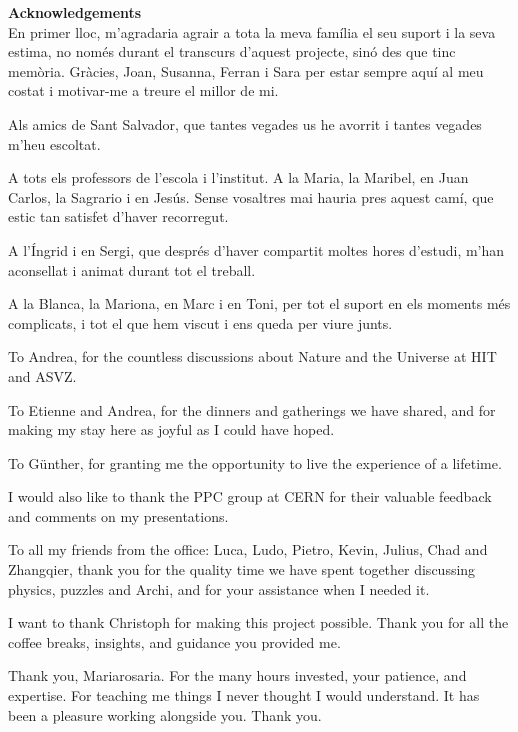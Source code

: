 \setlength{\parskip}{1em}
\thispagestyle{empty}
\noindent
{\huge \textbf{Acknowledgements}}
\\[1\baselineskip]
\noindent
En primer lloc, m'agradaria agrair a tota la meva família el seu suport i la seva estima, no només durant el transcurs d'aquest projecte, sinó des que tinc memòria. Gràcies, Joan, Susanna, Ferran i Sara per estar sempre aquí al meu costat i motivar-me a treure el millor de mi.

\noindent
Als amics de Sant Salvador, que tantes vegades us he avorrit i tantes vegades m'heu escoltat.

\noindent
A tots els professors de l'escola i l'institut. A la Maria, la Maribel, en Juan Carlos, la Sagrario i en Jesús. Sense vosaltres mai hauria pres aquest camí, que estic tan satisfet d'haver recorregut.

\noindent
A l'Íngrid i en Sergi, que després d'haver compartit moltes hores d'estudi, m'han aconsellat i animat durant tot el treball.

\noindent
A la Blanca, la Mariona, en Marc i en Toni, per tot el suport en els moments més complicats, i tot el que hem viscut i ens queda per viure junts.

\noindent
To Andrea, for the countless discussions about Nature and the Universe at HIT and ASVZ.

\noindent
To Etienne and Andrea, for the dinners and gatherings we have shared, and for making my stay here as joyful as I could have hoped.

\noindent
To Günther, for granting me the opportunity to live the experience of a lifetime.

\noindent
I would also like to thank the PPC group at CERN for their valuable feedback and comments on my presentations.

\noindent
To all my friends from the office: Luca, Ludo, Pietro, Kevin, Julius, Chad and Zhangqier, thank you for the quality time we have spent together discussing physics, puzzles and Archi, and for your assistance when I needed it.

\noindent
I want to thank Christoph for making this project possible. Thank you for all the coffee breaks, insights, and guidance you provided me.

\noindent
Thank you, Mariarosaria. For the many hours invested, your patience, and expertise. For teaching me things I never thought I would understand. It has been a pleasure working alongside you. Thank you.

\setlength{\parskip}{0.3em}